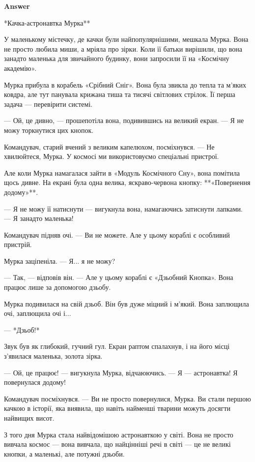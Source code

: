 \documentclass[10pt]{article}
\begin{document}
{\begin{minipage}{\textwidth}
\textbf{Answer}\par **Качка-астронавтка Мурка**
\par\smallskip
У маленькому містечку, де качки були найпопулярнішими, мешкала Мурка. Вона не просто любила миши, а мріяла про зірки. Коли її батьки вирішили, що вона занадто маленька для звичайного будинку, вони запросили її на «Космічну академію».
\par\smallskip
Мурка прибула в корабель «Срібний Сніг». Вона була звикла до тепла та м’яких ковдра, але тут панувала крижана тиша та тисячі світлових стрілок. Її перша задача — перевірити системі.
\par\smallskip
— Ой, це дивно, — прошепотіла вона, подивившись на великий екран. — Я не можу торкнутися цих кнопок.
\par\smallskip
Командувач, старий вчений з великим капелюхом, посміхнувся. — Не хвилюйтеся, Мурка. У космосі ми використовуємо спеціальні пристрої.
\par\smallskip
Але коли Мурка намагалася зайти в «Модуль Космічного Сну», вона помітила щось дивне. На екрані була одна велика, яскраво-червона кнопку: **«Повернення додому»**.
\par\smallskip
— Я не можу її натиснути — вигукнула вона, намагаючись затиснути лапками. — Я занадто маленька!
\par\smallskip
Командувач підняв очі. — Ви не можете. Але у цьому кораблі є особливий пристрій.
\par\smallskip
Мурка заціпеніла. — Я... я не можу?
\par\smallskip
— Так, — відповів він. — Але у цьому кораблі є «Дзьобний Кнопка». Вона працює лише за допомогою дзьобу.
\par\smallskip
Мурка подивилася на свій дзьоб. Він був дуже міцний і м’який. Вона заплющила очі, заплющила очі і...
\par\smallskip
— *Дзьоб!*
\par\smallskip
Звук був як глибокий, гучний гул. Екран раптом спалахнув, і на його місці з'явилася маленька, золота зірка.
\par\smallskip
— Ой, це працює! — вигукнула Мурка, відчаюючись. — Я — астронавтка! Я повернулася додому!
\par\smallskip
Командувач посміхнувся. — Ви не просто повернулися, Мурка. Ви стали першою качкою в історії, яка виявила, що навіть найменші тварини можуть досягти найвищих висот.
\par\smallskip
З того дня Мурка стала найвідомішою астронавткою у світі. Вона не просто вивчала космос — вона вивчала, що найцінніші речі в світі — це не великі кнопки, а маленькі, але потужні дзьоби.\par\smallskip

\end{minipage}}
\end{document}
